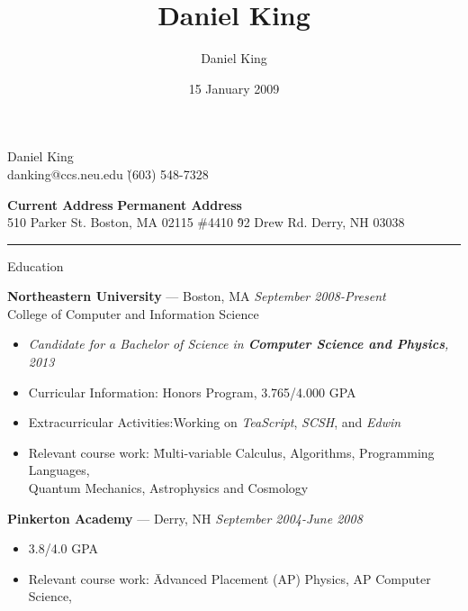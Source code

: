 \documentclass[10pt]{letter}
\author{Daniel King}
\title{Daniel King}
\date{15 January 2009}
\begin{document}
\begin{tabbing}{\Huge Daniel King} \\
\normalsize danking@ccs.neu.edu \`(603) 548-7328
\end{tabbing}

\vspace{-10pt}
\begin{tabbing}
\textbf{Current Address} \`\textbf{Permanent Address}\\
510 Parker St. Boston, MA 02115 \#4410 \`92 Drew Rd. Derry, NH 03038
\end{tabbing}\vspace{-15pt}
\rule{\linewidth}{.5pt}

{\Large Education}
\begin{tabbing}
{\large \bf Northeastern University} --- Boston, MA \` \textit{September 2008-Present} \\
College of Computer and Information Science
\end{tabbing}\vspace{-15pt}

\begin{itemize}
\setlength\itemsep{1pt}
\item[] \textit{Candidate for a Bachelor of Science in \textbf{Computer Science and Physics}, 2013}
\item Curricular Information:\hspace{.355in} Honors Program, 3.765/4.000 GPA
\item Extracurricular Activities:\hspace{.245in}Working on \textit{TeaScript}, \textit{SCSH}, and \textit{Edwin}
\item \begin{tabbing}Relevant course work:\hspace{.5in} \= Multi-variable Calculus, Algorithms, Programming Languages, \\
  \>Quantum Mechanics, Astrophysics and Cosmology\end{tabbing}
\end{itemize}

\begin{tabbing}
{\large \bf Pinkerton Academy} --- Derry, NH \` \textit{September 2004-June 2008}
\end{tabbing}\vspace{-15pt}
\begin{itemize}
\setlength\itemsep{1pt}
\item 3.8/4.0 GPA
\item \begin{tabbing}Relevant course work:\hspace{.5in} \= Advanced Placement (AP) Physics,
                                                          AP Computer Science,\end{tabbing}
\end{itemize}\vspace{-15pt}
\end{document}
